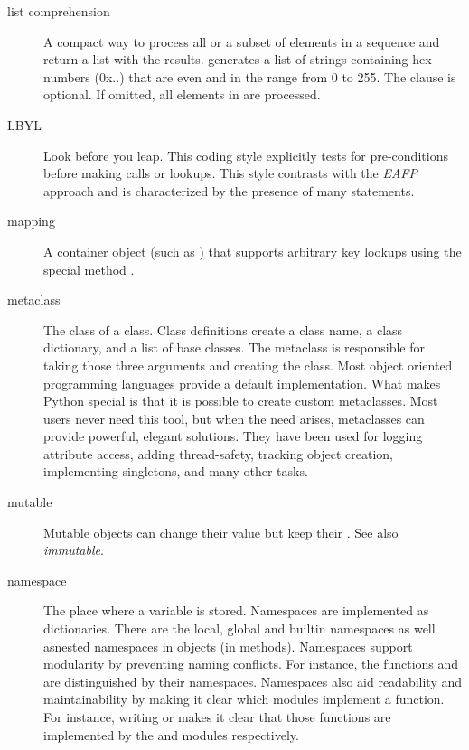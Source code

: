 \begin{description}
\item[list comprehension]
A compact way to process all or a subset of elements in a sequence and
return a list with the results.   generates a list of strings
containing hex numbers (0x..) that are even and in the range from 0 to 255.
The  clause is optional.  If omitted, all elements in
{} are processed.


\item[LBYL]
Look before you leap.  This coding style explicitly tests for
pre-conditions before making calls or lookups.  This style contrasts
with the \emph{EAFP} approach and is characterized by the presence of
many  statements.

\item[mapping]
A container object (such as ) that supports arbitrary key
lookups using the special method .

\item[metaclass]
The class of a class.  Class definitions create a class name, a class
dictionary, and a list of base classes.  The metaclass is responsible
for taking those three arguments and creating the class.  Most object
oriented programming languages provide a default implementation.  What
makes Python special is that it is possible to create custom
metaclasses.  Most users never need this tool, but when the need
arises, metaclasses can provide powerful, elegant solutions.  They
have been used for logging attribute access, adding thread-safety,
tracking object creation, implementing singletons, and many other
tasks.

\item[mutable]
Mutable objects can change their value but keep their .
See also \emph{immutable}.

\item[namespace]
The place where a variable is stored.  Namespaces are implemented as
dictionaries.  There are the local, global and builtin namespaces
as well asnested namespaces in objects (in methods).  Namespaces support
modularity by preventing naming conflicts.  For instance, the
functions  and  are
distinguished by their namespaces.  Namespaces also aid readability
and maintainability by making it clear which modules implement a
function.  For instance, writing  or
{} makes it clear that those functions are
implemented by the 
and  modules
respectively.


\end{description}
